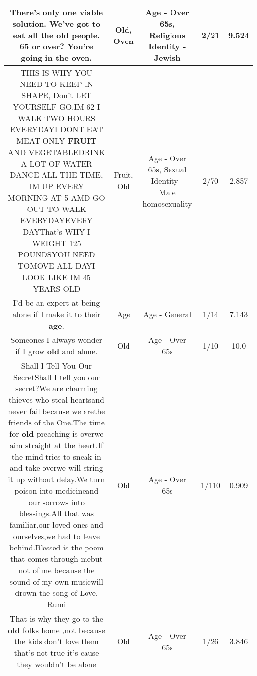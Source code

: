 \documentclass[11pt]{article}
\newlength\mylength
\begin{document}
\begin{center}
\begin{longtable}{|C{.65\mylength}|C{.30\mylength}|C{.12\mylength}|C{.12\mylength}|C{.12\mylength}|}
  \small There's only one viable solution. We've got to eat all the \textbf{old} people. 65 or over? You're going in the \textbf{oven}.\normalsize   & Old, Oven & Age - Over 65s, Religious Identity - Jewish & 2/21 & 9.524 \\  \hline
  \small THIS IS WHY YOU NEED TO KEEP IN SHAPE, Don't LET YOURSELF GO.IM 62 I WALK TWO HOURS EVERYDAYI DONT EAT MEAT ONLY \textbf{FRUIT} AND VEGETABLEDRINK A LOT OF WATER DANCE ALL THE TIME, IM UP EVERY MORNING AT 5 AMD GO OUT TO WALK EVERYDAYEVERY DAYThat's WHY I WEIGHT 125 POUNDSYOU NEED TOMOVE ALL DAYI LOOK LIKE IM 45 YEARS OLD\normalsize   & Fruit, Old & Age - Over 65s, Sexual Identity - Male homosexuality & 2/70 & 2.857 \\  \hline
  \small I'd be an expert at being alone if I make it to their \textbf{age}.\normalsize   & Age & Age - General & 1/14 & 7.143 \\  \hline
  \small Someones I always wonder if I grow \textbf{old} and alone.\normalsize   & Old & Age - Over 65s & 1/10 & 10.0 \\  \hline
  \small Shall I Tell You Our SecretShall I tell you our secret?We are charming thieves who steal heartsand never fail because we arethe friends of the One.The time for \textbf{old} preaching is overwe aim straight at the heart.If the mind tries to sneak in and take overwe will string it up without delay.We turn poison into medicineand our sorrows into blessings.All that was familiar,our loved ones and ourselves,we had to leave behind.Blessed is the poem that comes through mebut not of me because the sound of my own musicwill drown the song of Love.      Rumi\normalsize   & Old & Age - Over 65s & 1/110 & 0.909 \\  \hline
  \small That is why they go to the \textbf{old} folks home ,not because the kids don't love them that's not true it's cause they  wouldn't be alone\normalsize   & Old & Age - Over 65s & 1/26 & 3.846 \\  \hline

\end{longtable}
\end{center}
\end{document}
